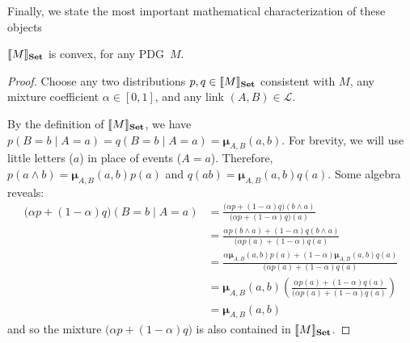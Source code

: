 \documentclass{article}
\newcommand\changed[1]{{\color{note-fg} #1}}
\newcommand\changeoff{\color{black} }
\newcommand{\MN}{PDG}%
\newcommand\Set{\textbf{Set}}
\newcommand\bmu{\boldsymbol{\mu}}
\begin{document}
	
	
	Finally, we state the most important mathematical characterization of these objects
	\begin{prop}%
		\label{prop:convex}
		$\bbr{M}_\Set$ is convex, for any \MN\ $M$.
	\end{prop}
	\changeoff
	\begin{proof}
		Choose any two distributions $p, q \in \bbr{M}_\Set$ consistent with $M$, any mixture coefficient $\alpha \in [0,1]$, and any link $(A,B) \in \mathcal L$.
		
		By the definition of $\bbr{M}_\Set$, we have $p(B = b \mid A = a) = q(B = b \mid A = a) = \bmu_{A,B}(a,b)$.  
		For brevity, we will use little letters ($a$) in place of events ($A = a$).
		Therefore, $p(a\land b) = \bmu_{A,B}(a,b) p(a)$ and $q(ab) = \bmu_{A,B}(a,b) q(a)$. Some algebra reveals:
		\begin{align*}
		\Big( \alpha p + (1-\alpha) q \Big) (B = b \mid A = a) &= 
		\frac{\Big( \alpha p + (1-\alpha) q \Big) (b \land a)}{\Big( \alpha p + (1-\alpha) q \Big) (a)} \\
		&= \frac{ \alpha p(b \land a) + (1-\alpha) q(b \land a) }{\Big( \alpha p(a) + (1-\alpha) q (a)} \\
		&= \frac{ \alpha \bmu_{A,B}(a,b) p(a) + (1-\alpha) \bmu_{A,B}(a,b) q(a) }{\Big( \alpha p(a) + (1-\alpha) q (a)} \\
		&=\bmu_{A,B}(a,b) \left(\frac{ \alpha  p(a) + (1-\alpha) q(a) }{\Big( \alpha p(a) + (1-\alpha) q (a)}\right)\\
		&= \bmu_{A,B}(a,b)
		\end{align*}
		and so the mixture $\Big(\alpha p + (1-\alpha) q \Big)$ is also contained in $\bbr{M}_\Set$.
	\end{proof}
	
	

\end{document}
